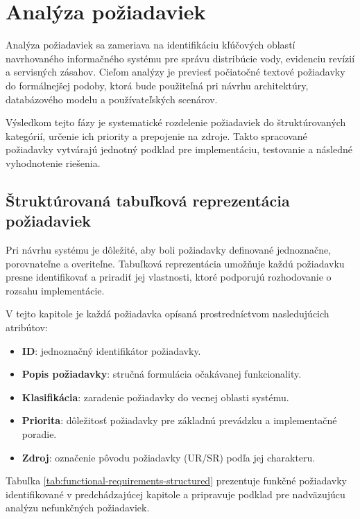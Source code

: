 
\chapter{Analýza požiadaviek}\label{ch:requirements-analysis}

Analýza požiadaviek sa zameriava na identifikáciu kľúčových oblastí navrhovaného informačného systému pre správu distribúcie vody, evidenciu revízií a servisných zásahov. Cieľom analýzy je previesť počiatočné textové požiadavky do formálnejšej podoby, ktorá bude použiteľná pri návrhu architektúry, databázového modelu a používateľských scenárov.

Výsledkom tejto fázy je systematické rozdelenie požiadaviek do štruktúrovaných kategórií, určenie ich priority a prepojenie na zdroje. Takto spracované požiadavky vytvárajú jednotný podklad pre implementáciu, testovanie a následné vyhodnotenie riešenia.

\section{Štruktúrovaná tabuľková reprezentácia požiadaviek}

Pri návrhu systému je dôležité, aby boli požiadavky definované jednoznačne, porovnateľne a overiteľne. Tabuľková reprezentácia umožňuje každú požiadavku presne identifikovať a priradiť jej vlastnosti, ktoré podporujú rozhodovanie o rozsahu implementácie.

V tejto kapitole je každá požiadavka opísaná prostredníctvom nasledujúcich atribútov:

\begin{itemize}
\item \textbf{ID}: jednoznačný identifikátor požiadavky.
\item \textbf{Popis požiadavky}: stručná formulácia očakávanej funkcionality.
\item \textbf{Klasifikácia}: zaradenie požiadavky do vecnej oblasti systému.
\item \textbf{Priorita}: dôležitosť požiadavky pre základnú prevádzku a implementačné poradie.
\item \textbf{Zdroj}: označenie pôvodu požiadavky (UR/SR) podľa jej charakteru.
\end{itemize}

Tabuľka \ref{tab:functional-requirements-structured} prezentuje funkčné požiadavky identifikované v predchádzajúcej kapitole a pripravuje podklad pre nadväzujúcu analýzu nefunkčných požiadaviek.

